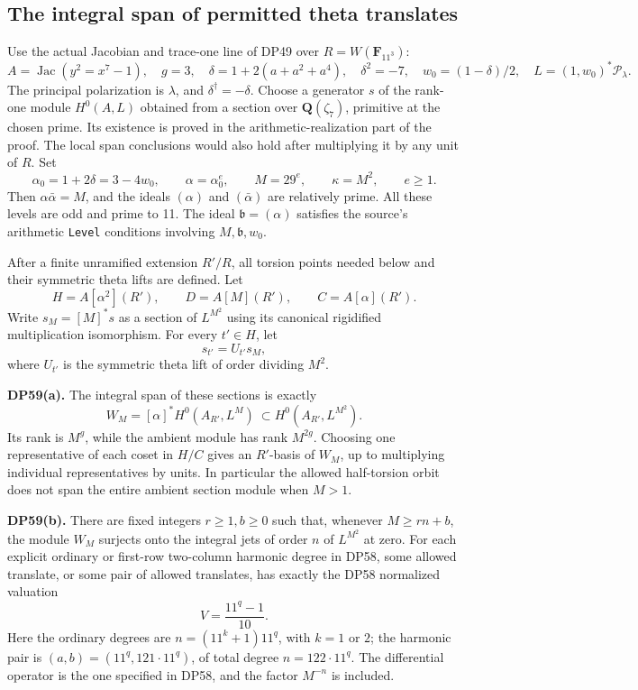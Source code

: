 \subsection{The integral span of permitted theta translates}

\begin{theorem}\label{DP59}
Use the actual Jacobian and trace-one line of DP49 over \(R=W(\mathbf F_{11^3})\): \[
 A=\operatorname{Jac}(y^2=x^7-1),\quad g=3,\quad
 \delta=1+2(a+a^2+a^4),\quad \delta^2=-7,\quad
 w_0=(1-\delta)/2,\quad
 L=(1,w_0)^*\mathcal P_\lambda.
\] The principal polarization is \(\lambda\), and \(\delta^\dagger=-\delta\). Choose a generator \(s\) of the rank-one module \(H^0(A,L)\) obtained from a section over \(\mathbf Q(\zeta_7)\), primitive at the chosen prime. Its existence is proved in the arithmetic-realization part of the proof. The local span conclusions would also hold after multiplying it by any unit of \(R\). Set \[
 \alpha_0=1+2\delta=3-4w_0,\qquad
 \alpha=\alpha_0^e,\qquad M=29^e,\qquad \kappa=M^2,
 \qquad e\ge1.
 \tag{TS1}
\] Then \(\alpha\bar\alpha=M\), and the ideals \((\alpha)\) and \((\bar\alpha)\) are relatively prime. All these levels are odd and prime to 11. The ideal \(\mathfrak b=(\alpha)\) satisfies the source's arithmetic \texttt{Level} conditions involving \(M,\mathfrak b,w_0\).

After a finite unramified extension \(R'/R\), all torsion points needed below and their symmetric theta lifts are defined. Let \[
 H=A[\alpha^2](R'),\qquad D=A[M](R'),\qquad C=A[\alpha](R').
 \tag{TS2}
\] Write \(s_M=[M]^*s\) as a section of \(L^{M^2}\) using its canonical rigidified multiplication isomorphism. For every \(t'\in H\), let \[
 s_{t'}=U_{t'}s_M,
 \tag{TS3}
\] where \(U_{t'}\) is the symmetric theta lift of order dividing \(M^2\).

\textbf{DP59(a).} The integral span of these sections is exactly \[
 W_M=[\alpha]^*H^0(A_{R'},L^M)
       \ \subset H^0(A_{R'},L^{M^2}).
 \tag{TS4}
\] Its rank is \(M^g\), while the ambient module has rank \(M^{2g}\). Choosing one representative of each coset in \(H/C\) gives an \(R'\)-basis of \(W_M\), up to multiplying individual representatives by units. In particular the allowed half-torsion orbit does not span the entire ambient section module when \(M>1\).

\textbf{DP59(b).} There are fixed integers \(r\ge1,b\ge0\) such that, whenever \(M\ge rn+b\), the module \(W_M\) surjects onto the integral jets of order \(n\) of \(L^{M^2}\) at zero. For each explicit ordinary or first-row two-column harmonic degree in DP58, some allowed translate, or some pair of allowed translates, has exactly the DP58 normalized valuation \[
 V=\frac{11^q-1}{10}.
 \tag{TS5}
\] Here the ordinary degrees are \(n=(11^k+1)11^q\), with \(k=1\) or \(2\); the harmonic pair is \((a,b)=(11^q,121\cdot11^q)\), of total degree \(n=122\cdot11^q\). The differential operator is the one specified in DP58, and the factor \(M^{-n}\) is included.


\end{theorem}
